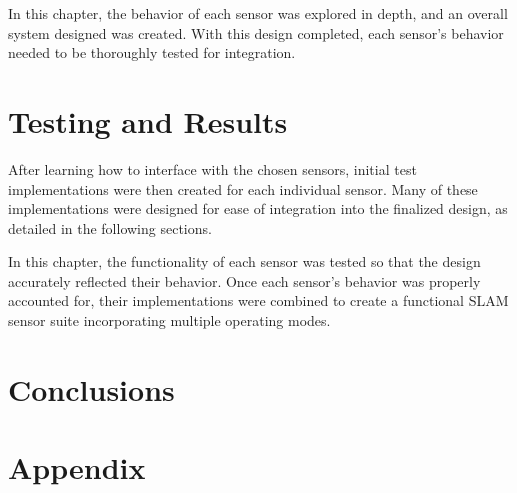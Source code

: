 \documentclass[12pt]{article}
\begin{document}
\par\null\par
In this chapter, the behavior of each sensor was explored in depth, and an overall system designed was created. With this design completed, each sensor's behavior needed to be thoroughly tested for integration.

\newpage 
\section{Testing and Results}
After learning how to interface with the chosen sensors, initial test implementations were then created for each individual sensor. Many of these implementations were designed for ease of integration into the finalized design, as detailed in the following sections.







\par\null\par
In this chapter, the functionality of each sensor was tested so that the design accurately reflected their behavior. Once each sensor's behavior was properly accounted for, their implementations were combined to create a functional SLAM sensor suite incorporating multiple operating modes.

\newpage 
\section{Conclusions}


\newpage
\singlespacing
\doublespacing
\newpage

\section*{Appendix} %
\setcounter{subsection}{0}
\renewcommand\thesubsection{\Alph{subsection}}
\renewcommand\thesubsubsection{\thesubsection.\roman{subsubsection}}

\newpage

\newpage

%
%
%
%

\end{document}
